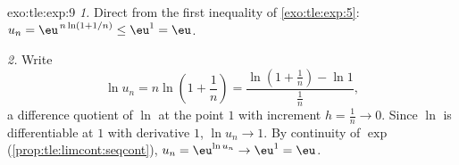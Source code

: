 \begin{solution}{exo:tle:exp:9}
\emph{1.} Direct from the first inequality of \cref{exo:tle:exp:5}:
$u_n = \eu^{\,n\ln(1+1/n)} \leq \eu^1 = \eu$.

\emph{2.} Write
\[
\ln u_n = n \ln\!\left(1 + \frac1n\right)
= \frac{\ln\!\left(1 + \frac1n\right) - \ln 1}{\frac1n},
\]
a difference quotient of $\ln$ at the point $1$ with increment
$h = \frac1n \to 0$. Since $\ln$ is differentiable at $1$ with derivative
$1$, $\ln u_n \to 1$. By continuity of $\exp$
(\cref{prop:tle:limcont:seqcont}), $u_n = \eu^{\ln u_n} \to \eu^1 = \eu$.
\end{solution}
